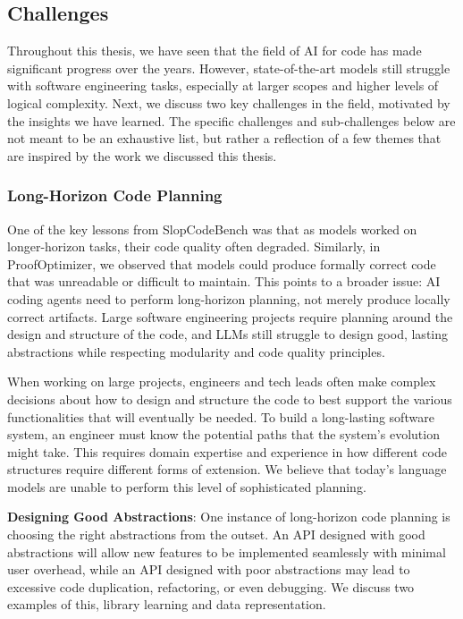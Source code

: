 \subsection{Challenges} \label{sec:challenges}
Throughout this thesis, we have seen that the field of AI for code has made significant progress
over the years. However, state-of-the-art models still struggle with software engineering tasks, especially
at larger scopes and higher levels of logical complexity. Next, we discuss
two key challenges in the field, motivated by the insights we have learned.
The specific challenges and sub-challenges below are not meant to be an exhaustive list, but rather a 
reflection of a few themes that are inspired by the work we discussed this thesis.

\subsubsection{Long-Horizon Code Planning} \label{sec:c-long-horizon}

One of the key lessons from SlopCodeBench was that as models worked on longer-horizon tasks, their code quality often degraded. Similarly, in ProofOptimizer, we observed that models could produce formally correct code that was unreadable or difficult to maintain. This points to a broader issue: AI coding agents need to perform long-horizon planning, not merely produce locally correct artifacts. Large software engineering projects require planning around the design and structure of the code, and LLMs still struggle to design good, lasting abstractions while respecting modularity and code quality principles.

When working on large projects, engineers and tech leads often make complex decisions about how to design and structure the code to best support the various functionalities that will eventually be needed. To build a long-lasting software system, an engineer must know the potential paths that the system's evolution might take. This requires domain expertise and experience in how different code structures require different forms of extension. We believe that today's language models are unable to perform this level of sophisticated planning.

\textbf{Designing Good Abstractions}:
One instance of long-horizon code planning is choosing the right abstractions from the outset. An API designed with good abstractions will allow new features to be implemented seamlessly with minimal user overhead, while an API designed with poor abstractions may lead to excessive code duplication, refactoring, or even debugging. We discuss two examples of this, library learning and data representation.

